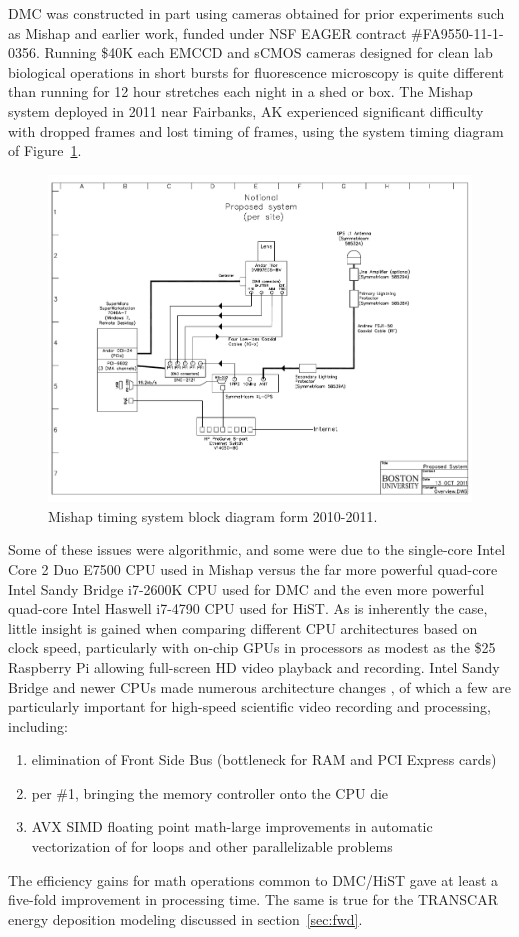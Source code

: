 DMC was constructed in part using cameras obtained for prior experiments such as Mishap and earlier work, funded under NSF EAGER contract \#FA9550-11-1-0356.
Running \$40K each EMCCD and sCMOS cameras designed for clean lab biological operations in short bursts for fluorescence microscopy is quite different than running for 12 hour stretches each night in a shed or box.
The Mishap system \citep{plant2011} deployed in 2011 near Fairbanks, AK experienced significant difficulty with dropped frames and lost timing of frames, using the system timing diagram of Figure~\ref{fig:mishap}.
\begin{figure}
    \includegraphics[page=2,width=0.95\linewidth]{gfx/ProposedTimingSystem}
    \caption{Mishap timing system block diagram form 2010-2011.}\label{fig:mishap}
\end{figure}
Some of these issues were algorithmic, and some were due to the single-core Intel Core 2 Duo E7500 CPU used in Mishap versus the far more powerful quad-core Intel Sandy Bridge i7-2600K CPU used for DMC and the even more powerful quad-core Intel Haswell i7-4790 CPU used for HiST.
As is inherently the case, little insight is gained when comparing different CPU architectures based on clock speed, particularly with on-chip GPUs in processors as modest as the \$25 Raspberry Pi allowing full-screen HD video playback and recording.
Intel Sandy Bridge and newer CPUs made numerous architecture changes \citep{lempel2011}, of which a few are particularly important for high-speed scientific video recording and processing, including:
\begin{enumerate}
    \item elimination of Front Side Bus (bottleneck for RAM and PCI Express cards)
    \item per \#1, bringing the memory controller onto the CPU die
    \item AVX SIMD floating point math-large improvements in automatic vectorization of for loops and other parallelizable problems
\end{enumerate}
The efficiency gains for math operations common to DMC/HiST gave at least a five-fold improvement in processing time.
The same is true for the TRANSCAR energy deposition modeling discussed in section~\ref{sec:fwd}.

